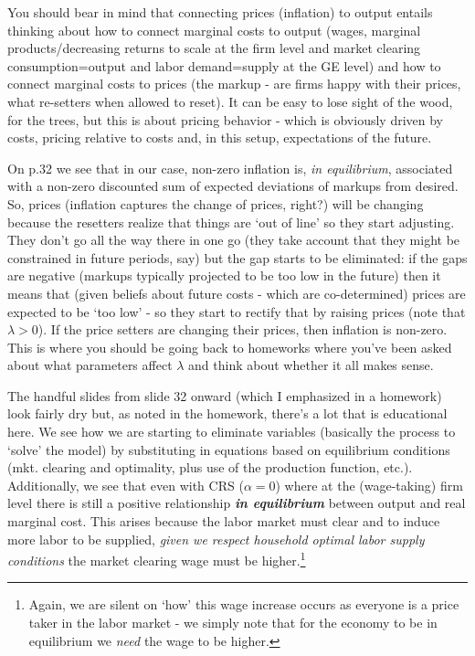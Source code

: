 \documentclass[authoryear,11pt]{elsarticle}
\begin{document}
You should bear in mind that connecting prices (inflation) to output entails thinking about how to connect marginal costs to output (wages, marginal products/decreasing returns to scale at the firm level and market clearing consumption=output and labor demand=supply at the GE level) and how to connect marginal costs to prices (the markup - are firms happy with their prices, what re-setters when allowed to reset). It can be easy to lose sight of the wood, for the trees, but this is about pricing behavior - which is obviously driven by costs, pricing relative to costs and, in this setup, expectations of the future.

On p.32 we see that in our case, non-zero inflation is, \textit{in equilibrium}, associated with a non-zero discounted sum of expected deviations of markups from desired. So, prices (inflation captures the change of prices, right?) will be changing because the resetters realize that things are `out of line' so they start adjusting. They don't go all the way there in one go (they take account that they might be constrained in future periods, say) but the gap starts to be eliminated: if the gaps are negative (markups typically projected to be too low in the future) then it means that (given beliefs about future costs - which are co-determined) prices are expected to be `too low' - so they start to rectify that by raising prices (note that $\lambda>0$). If the price setters are changing their prices, then inflation is non-zero. This is where you should be going back to homeworks where you've been asked about what parameters affect $\lambda$ and think about whether it all makes sense.

The handful slides from slide 32 onward (which I emphasized in a homework) look fairly dry but, as noted in the homework, there's a lot that is educational here. We see how we are starting to eliminate variables (basically the process to `solve' the model) by substituting in equations based on equilibrium conditions (mkt. clearing and optimality, plus use of the production function, etc.). Additionally, we see that even with CRS ($\alpha =0$) where at the (wage-taking) firm level there is still a positive relationship \textit{\textbf{in equilibrium}} between output and real marginal cost. This arises because the labor market must clear and to induce more labor to be supplied, \textit{given we respect household optimal labor supply conditions} the market clearing wage must be higher.\footnote{Again, we are silent on `how' this wage increase occurs as everyone is a price taker in the labor market - we simply note that for the economy to be in equilibrium we \textit{need} the wage to be higher.}
\end{document}
